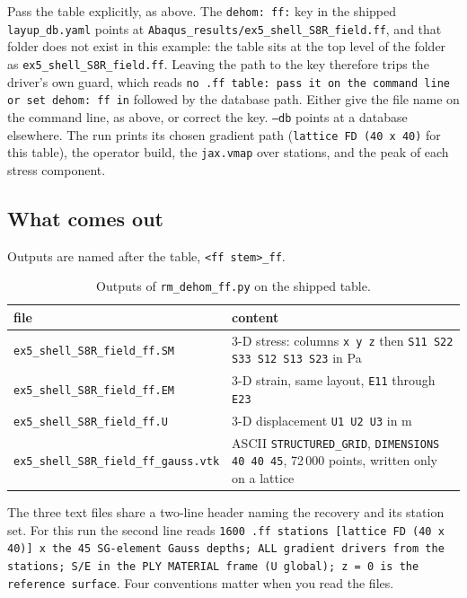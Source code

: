 Pass the table explicitly, as above. The \texttt{dehom: ff:} key in the shipped
\texttt{layup\_db.yaml} points at
\texttt{Abaqus\_results/ex5\_shell\_S8R\_field.ff}, and that folder does not
exist in this example: the table sits at the top level of the folder as
\texttt{ex5\_shell\_S8R\_field.ff}. Leaving the path to the key therefore trips
the driver's own guard, which reads \texttt{no .ff table: pass it on the command
line or set dehom: ff in} followed by the database path. Either give the file
name on the command line, as above, or correct the key. \texttt{--db} points at a database elsewhere. The run prints its chosen
gradient path (\texttt{lattice FD (40 x 40)} for this table), the operator
build, the \texttt{jax.vmap} over stations, and the peak of each stress
component.

\subsection{What comes out}

Outputs are named after the table, \texttt{<ff stem>\_ff}.

\begin{table}[htbp]
\centering
\footnotesize
\begin{tabular}{lp{8.0cm}}
\toprule
file & content \\
\midrule
\texttt{ex5\_shell\_S8R\_field\_ff.SM} & 3-D stress: columns \texttt{x y z} then
  \texttt{S11 S22 S33 S12 S13 S23} in Pa \\
\texttt{ex5\_shell\_S8R\_field\_ff.EM} & 3-D strain, same layout, \texttt{E11}
  through \texttt{E23} \\
\texttt{ex5\_shell\_S8R\_field\_ff.U} & 3-D displacement \texttt{U1 U2 U3} in m \\
\texttt{ex5\_shell\_S8R\_field\_ff\_gauss.vtk} & ASCII
  \texttt{STRUCTURED\_GRID}, \texttt{DIMENSIONS 40 40 45}, 72\,000 points,
  written only on a lattice \\
\bottomrule
\end{tabular}
\caption{Outputs of \texttt{rm\_dehom\_ff.py} on the shipped table.}
\label{tab:solid-ex2out}
\end{table}

The three text files share a two-line header naming the recovery and its station
set. For this run the second line reads \texttt{1600 .ff stations
[lattice FD (40 x 40)] x the 45 SG-element Gauss depths; ALL gradient drivers
from the stations; S/E in the PLY MATERIAL frame (U global); z = 0 is the
reference surface}. Four conventions matter when you read the files.

